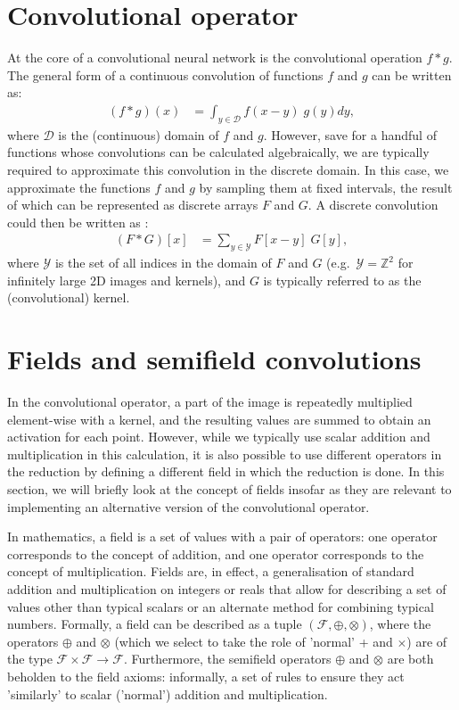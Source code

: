 \documentclass[a4paper, 12pt]{report}
\begin{document}
\section{Convolutional operator}
At the core of a convolutional neural network is the convolutional operation $f*g$. The general form of a continuous convolution of functions $f$ and $g$ can be written as:
\begin{align}
(f*g)(x) &= \int_{y\in\mathcal{D}} f(x-y)\; g(y)dy	,
\end{align}
where $\mathcal{D}$ is the (continuous) domain of $f$ and $g$. However, save for a handful of functions whose convolutions can be calculated algebraically, we are typically required to approximate this convolution in the discrete domain. In this case, we approximate the functions $f$ and $g$ by sampling them at fixed intervals, the result of which can be represented as discrete arrays $F$ and $G$. A discrete convolution could then be written as \cite{szeliski2022computer}:
\begin{align}
(F*G)[x] &= \sum_{y\in\mathcal{Y}} F[x-y]\; G[y],
\end{align}
where $\mathcal{Y}$ is the set of all indices in the domain of $F$ and $G$ (e.g.\ $\mathcal{Y}=\mathbb{Z}^2$ for infinitely large 2D images and kernels), and $G$ is typically referred to as the (convolutional) kernel.


\section{Fields and semifield convolutions}
In the convolutional operator, a part of the image is repeatedly multiplied element-wise with a kernel, and the resulting values are summed to obtain an activation for each point. However, while we typically use scalar addition and multiplication in this calculation, it is also possible to use different operators in the reduction by defining a different field in which the reduction is done. In this section, we will briefly look at the concept of fields insofar as they are relevant to implementing an alternative version of the convolutional operator.

In mathematics, a field is a set of values with a pair of operators: one operator corresponds to the concept of addition, and one operator corresponds to the concept of multiplication. Fields are, in effect, a generalisation of standard addition and multiplication on integers or reals that allow for describing a set of values other than typical scalars or an alternate method for combining typical numbers. Formally, a field can be described as a tuple $(\mathcal{F}, \oplus, \otimes)$, where the operators $\oplus$ and $\otimes$ (which we select to take the role of 'normal' + and $\times$) are of the type $\mathcal{F}\times\mathcal{F}\rightarrow\mathcal{F}$. Furthermore, the semifield operators $\oplus$ and $\otimes$ are both beholden to the field axioms: informally, a set of rules to ensure they act 'similarly' to scalar ('normal') addition and multiplication. 
\end{document}
